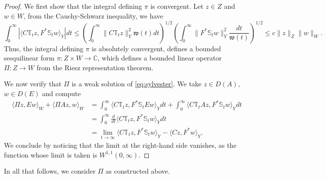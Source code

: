 \documentclass[10pt]{article}
\begin{document}
\begin{proof}
We first show that the integral defining $\pi$ is convergent. Let $z \in Z$ and $w \in W$, from the Cauchy-Schwarz inequality, we have
\[
\int_0^\infty |\langle C\mathbb T_t z,F^* \mathbb S_tw\rangle_Y| d t \leq \left(\int_0^\infty \| C \mathbb{T}_t z \|_Y^2 \mathfrak{w}(t) dt \right)^{1/2} \left(\int_0^\infty \| F^* \mathbb{S}_t w \|_Y^2 \frac{dt}{\mathfrak{w}(t)} \right)^{1/2} \leq c \| z \|_Z \|w\|_W.
\]
Thus, the integral defining $\pi$ is absolutely convergent, defines a bounded sesquilinear form $\pi : Z \times W \rightarrow \mathbb{C}$, which defines a bounded linear operator $\Pi : Z \rightarrow W$ from the Riesz representation theorem. 

We now verify that $\Pi$ is a weak solution of \eqref{eq:sylvester}. We take $z \in D(A)$, $w \in D(E)$ and compute
\begin{align*}
\langle \Pi z,Ew\rangle_W + \langle \Pi A z,w\rangle_W &= \int_0^\infty \langle C\mathbb T_t z, F^*\mathbb S_t Ew\rangle_Y dt + \int_0^\infty \langle C\mathbb T_t Az, F^*\mathbb S_t w\rangle_Y dt\\
&= \int_0^\infty \frac{d}{dt}\langle C\mathbb T_t z, F^* \mathbb S_t w\rangle_Y dt\\
&=   \lim_{t \rightarrow \infty} \langle C\mathbb T_t z,F^* \mathbb S_t w\rangle_Y - \langle Cz,F^*w\rangle_Y.
\end{align*}
We conclude by noticing that the limit at the right-hand side vanishes, as the function whose limit is taken is $W^{1,1}(0,\infty)$.
\end{proof}
In all that follows, we consider $\Pi$ as constructed above. 
\end{document}
